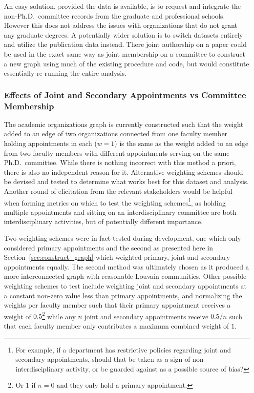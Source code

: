 \documentclass[notitlepage,aps,prd,nofootinbib]{revtex4-1}
\begin{document}
An easy solution, provided the data is available, is to request and integrate the non-Ph.D.\ committee records from the graduate and professional schools. However this does not address the issues with organizations that do not grant any graduate degrees. A potentially wider solution is to switch datasets entirely and utilize the  publication data instead. There joint authorship on a paper could be used in the exact same way as joint membership on a committee to construct a new graph using much of the existing procedure and code, but would constitute essentially re-running the entire analysis.

\subsubsection{Effects of Joint and Secondary Appointments vs Committee Membership}
The academic organizations graph is currently constructed such that the weight added to an edge of two organizations connected from one faculty member holding appointments in each ($w=1$) is the same as the weight added to an edge from two faculty members with different appointments serving on the same Ph.D.\ committee. While there is nothing incorrect with this method a priori, there is also no independent reason for it. Alternative weighting schemes should be devised and tested to determine what works best for this dataset and analysis. Another round of elicitation from the relevant stakeholders would be helpful when forming metrics on which to test the weighting schemes\footnote{For example, if a department has restrictive policies regarding joint and secondary appointments, should that be taken as a sign of non-interdisciplinary activity, or be guarded against as a possible source of bias?}, as holding multiple appointments and sitting on an interdisciplinary committee are both interdisciplinary activities, but of potentially different importance.

Two weighting schemes were in fact tested during development, one which only considered primary appointments and the second as presented here in Section~\ref{sec:construct_graph} which weighted primary, joint and secondary appointments equally. The second method was ultimately chosen as it produced a more interconnected graph with reasonable Louvain communities. Other possible weighting schemes to test include weighting joint and secondary appointments at a constant non-zero value less than primary appointments, and normalizing the weights per faculty member such that their primary appointment receives a weight of $0.5$\footnote{Or $1$ if $n=0$ and they only hold a primary appointment.} while any $n$ joint and secondary appointments receive $0.5 / n$ such that each faculty member only contributes a maximum combined weight of $1$.
\end{document}
